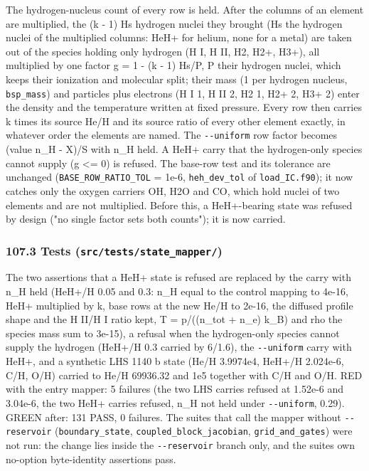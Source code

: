 \documentclass[english,a4paper]{my_memo}
\begin{document}
The hydrogen-nucleus count of every row is held. After the columns of an
element are multiplied, the (k - 1) Hs hydrogen nuclei they brought (Hs the
hydrogen nuclei of the multiplied columns: HeH+ for helium, none for a
metal) are taken out of the species holding only hydrogen (H I, H II, H2,
H2+, H3+), all multiplied by one factor g = 1 - (k - 1) Hs/P, P their
hydrogen nuclei, which keeps their ionization and molecular split; their
mass (1 per hydrogen nucleus, \texttt{bsp\_mass}) and particles plus electrons
(H I 1, H II 2, H2 1, H2+ 2, H3+ 2) enter the density and the temperature
written at fixed pressure. Every row then carries k times its source He/H
and its source ratio of every other element exactly, in whatever order the
elements are named. The \texttt{-\/-uniform} row factor becomes
(value n\_H - X)/S with n\_H held. A HeH+ carry that the hydrogen-only species
cannot supply (g \textless= 0) is refused. The base-row test and its tolerance are
unchanged (\texttt{BASE\_ROW\_RATIO\_TOL} = 1e-6, \texttt{heh\_dev\_tol} of \texttt{load\_IC.f90}); it
now catches only the oxygen carriers OH, H2O and CO, which hold nuclei of
two elements and are not multiplied. Before this, a HeH+-bearing state was
refused by design ("no single factor sets both counts"); it is now carried.

\subsubsection{\texorpdfstring{107.3 Tests (\texttt{src/tests/state\_mapper/})}{107.3 Tests (src/tests/state\_mapper/)}}\label{1073-tests-srctestsstate_mapper}

The two assertions that a HeH+ state is refused are replaced by the
carry with n\_H held (HeH+/H 0.05 and 0.3: n\_H equal to the control mapping to
4e-16, HeH+ multiplied by k, base rows at the new He/H to 2e-16, the
diffused profile shape and the H II/H I ratio kept, T = p/((n\_tot + n\_e) k\_B)
and rho the species mass sum to 3e-15), a refusal when the hydrogen-only
species cannot supply the hydrogen (HeH+/H 0.3 carried by 6/1.6), the
\texttt{-\/-uniform} carry with HeH+, and a synthetic LHS 1140 b state (He/H 3.9974e4,
HeH+/H 2.024e-6, C/H, O/H) carried to He/H 69936.32 and 1e5 together with
C/H and O/H. RED with the entry mapper: 5 failures (the two LHS carries
refused at 1.52e-6 and 3.04e-6, the two HeH+ carries refused, n\_H not held
under \texttt{-\/-uniform}, 0.29). GREEN after: 131 PASS, 0 failures. The suites that
call the mapper without \texttt{-\/-reservoir} (\texttt{boundary\_state},
\texttt{coupled\_block\_jacobian}, \texttt{grid\_and\_gates}) were not run: the change lies
inside the \texttt{-\/-reservoir} branch only, and the suite\textquotesingle s own no-option
byte-identity assertions pass.
\end{document}

